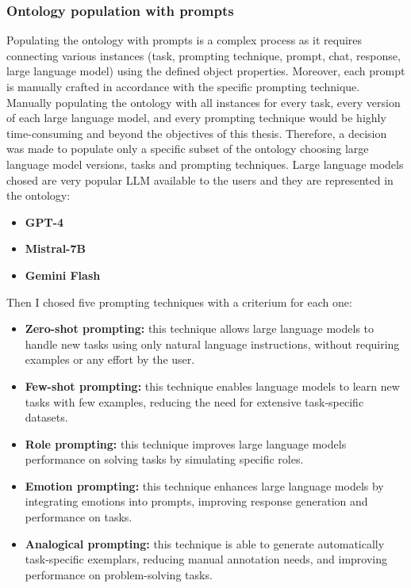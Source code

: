 \subsubsection{Ontology population with prompts}
Populating the ontology with prompts is a complex process as it requires connecting various instances (task, prompting technique, prompt, chat, response, large language model) using the defined object properties. Moreover, each prompt is manually crafted in accordance with the specific prompting technique. Manually populating the ontology with all instances for every task, every version of each large language model, and every prompting technique would be highly time-consuming and beyond the objectives of this thesis. Therefore, a decision was made to populate only a specific subset of the ontology choosing large language model versions, tasks and prompting techniques. Large language models chosed are very popular LLM available to the users and they are represented in the ontology:
\begin{itemize}
    \item \textbf{GPT-4}
    \item \textbf{Mistral-7B}
    \item \textbf{Gemini Flash}
\end{itemize}
Then I chosed five prompting techniques with a criterium for each one:
\begin{itemize}
    \item \textbf{Zero-shot prompting:} this technique allows large language models to handle new tasks using only natural language instructions, without requiring examples or any effort by the user.

    \item \textbf{Few-shot prompting:} this technique  enables language models to learn new tasks with few examples, reducing the need for extensive task-specific datasets.
    
    \item \textbf{Role prompting:} this technique improves large language models performance on solving tasks by simulating specific roles.

    \item \textbf{Emotion prompting:} this technique enhances large language models by integrating emotions into prompts, improving response generation and performance on tasks.

    \item \textbf{Analogical prompting:} this technique is able to generate automatically task-specific exemplars, reducing manual annotation needs, and improving performance on problem-solving tasks.
\end{itemize}
